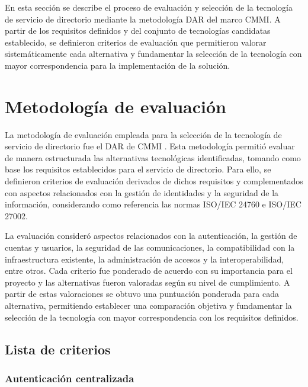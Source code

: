 \label{cap:dar}
\vspace*{0.7cm}

En esta sección se describe el proceso de evaluación y selección de la tecnología de servicio de directorio mediante la metodología \ac{DAR} del marco \ac{CMMI}. A partir de los requisitos definidos y del conjunto de tecnologías candidatas establecido, se definieron criterios de evaluación que permitieron valorar sistemáticamente cada alternativa y fundamentar la selección de la tecnología con mayor correspondencia para la implementación de la solución.

\section{Metodología de evaluación}\label{sec:dar-metodologia}

La metodología de evaluación empleada para la selección de la tecnología de servicio de directorio fue el \ac{DAR} de \ac{CMMI} \citep{CMMIInstitute2010}. Esta metodología permitió evaluar de manera estructurada las alternativas tecnológicas identificadas, tomando como base los requisitos establecidos para el servicio de directorio. Para ello, se definieron criterios de evaluación derivados de dichos requisitos y complementados con aspectos relacionados con la gestión de identidades y la seguridad de la información, considerando como referencia las normas ISO/IEC 24760 e ISO/IEC 27002.

La evaluación consideró aspectos relacionados con la autenticación, la gestión de cuentas y usuarios, la seguridad de las comunicaciones, la compatibilidad con la infraestructura existente, la administración de accesos y la interoperabilidad, entre otros. Cada criterio fue ponderado de acuerdo con su importancia para el proyecto y las alternativas fueron valoradas según su nivel de cumplimiento. A partir de estas valoraciones se obtuvo una puntuación ponderada para cada alternativa, permitiendo establecer una comparación objetiva y fundamentar la selección de la tecnología con mayor correspondencia con los requisitos definidos.

\subsection{Lista de criterios}\label{subsec:dar-lista-criterios}

\subsubsection{Autenticación centralizada}

